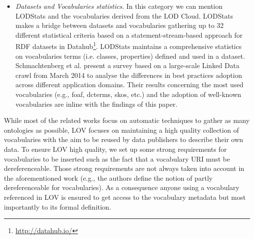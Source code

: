\documentclass{iosart2c}
\begin{document}
\begin{itemize}
 \item \textit{Datasets and Vocabularies statistics}. In this category we can mention LODStats \cite{demter-2012-ekaw} and the vocabularies derived from the LOD Cloud.  LODStats makes a bridge between datasets and vocabularies gathering up to 32 different statistical criteria based on a statement-stream-based approach for RDF datasets in Datahub\footnote{\url{http://datahub.io/}}. LODStats maintains a comprehensive statistics on vocabularies terms (i.e. classes, properties) defined and used in a dataset. Schmachtenberg et al. \cite{max2014} present a survey based on a large-scale Linked Data crawl from March 2014 to analyse the differences in best practices adoption across different application domains. Their results concerning the most used vocabularies (e.g., foaf, dcterms, skos, etc.) and the adoption of well-known vocabularies are inline with the findings of this paper.
\end{itemize}

While most of the related works focus on automatic techniques to gather as many ontologies as possible, LOV focuses on maintaining a high quality collection of vocabularies with the aim to be reused by data publishers to describe their own data. To ensure LOV high quality, we set up some strong requirements for vocabularies to be inserted such as the fact that a vocabulary URI must be dereferenceable. Those strong requirements are not always taken into account in the aforementioned work (e.g., the authors define the notion of partly dereferenceable for vocabularies). As a consequence anyone using a vocabulary referenced in LOV is ensured to get access to the vocabulary metadata but most importantly to its formal definition. 

\end{document}
